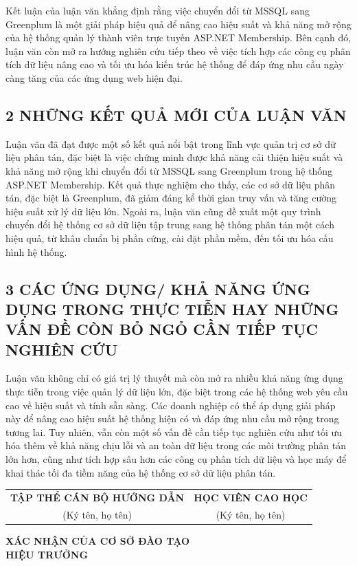 \documentclass{article}[13pt]
\begin{document}
Kết luận của luận văn khẳng định rằng việc chuyển đổi từ MSSQL sang Greenplum là một giải pháp hiệu quả để nâng cao hiệu suất và khả năng mở rộng của hệ thống quản lý thành viên trực tuyến ASP.NET Membership. Bên cạnh đó, luận văn còn mở ra hướng nghiên cứu tiếp theo về việc tích hợp các công cụ phân tích dữ liệu nâng cao và tối ưu hóa kiến trúc hệ thống để đáp ứng nhu cầu ngày càng tăng của các ứng dụng web hiện đại.


\subsection*{2 NHỮNG KẾT QUẢ MỚI CỦA LUẬN VĂN}
Luận văn đã đạt được một số kết quả nổi bật trong lĩnh vực quản trị cơ sở dữ liệu phân tán, đặc biệt là việc chứng minh được khả năng cải thiện hiệu suất và khả năng mở rộng khi chuyển đổi từ MSSQL sang Greenplum trong hệ thống ASP.NET Membership. Kết quả thực nghiệm cho thấy, các cơ sở dữ liệu phân tán, đặc biệt là Greenplum, đã giảm đáng kể thời gian truy vấn và tăng cường hiệu suất xử lý dữ liệu lớn. Ngoài ra, luận văn cũng đề xuất một quy trình chuyển đổi hệ thống cơ sở dữ liệu tập trung sang hệ thống phân tán một cách hiệu quả, từ khâu chuẩn bị phần cứng, cài đặt phần mềm, đến tối ưu hóa cấu hình hệ thống.


\subsection*{3 CÁC ỨNG DỤNG/ KHẢ NĂNG ỨNG DỤNG TRONG THỰC TIỄN
HAY NHỮNG VẤN ĐỀ CÒN BỎ NGỎ CẦN TIẾP TỤC NGHIÊN CỨU}

Luận văn không chỉ có giá trị lý thuyết mà còn mở ra nhiều khả năng ứng dụng thực tiễn trong việc quản lý dữ liệu lớn, đặc biệt trong các hệ thống web yêu cầu cao về hiệu suất và tính sẵn sàng. Các doanh nghiệp có thể áp dụng giải pháp này để nâng cao hiệu suất hệ thống hiện có và đáp ứng nhu cầu mở rộng trong tương lai. Tuy nhiên, vẫn còn một số vấn đề cần tiếp tục nghiên cứu như tối ưu hóa thêm về khả năng chịu lỗi và an toàn dữ liệu trong các môi trường phân tán lớn hơn, cũng như tích hợp sâu hơn các công cụ phân tích dữ liệu và học máy để khai thác tối đa tiềm năng của hệ thống cơ sở dữ liệu phân tán.

\begin{center}
    \begin{tabular}{c c}
        \textbf{TẬP THỂ CÁN BỘ HƯỚNG DẪN} & \textbf{HỌC VIÊN CAO HỌC} \\
        (Ký tên, họ tên) & (Ký tên, họ tên) \\
    \end{tabular}
    
    \vspace{3cm} %
    
    \textbf{XÁC NHẬN CỦA CƠ SỞ ĐÀO TẠO} \\
    \textbf{HIỆU TRƯỞNG}
\end{center}
\end{document}
